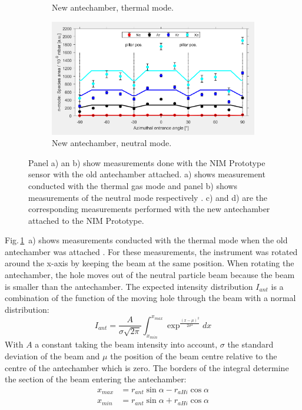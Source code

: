 \begin{figure}[h!]
\begin{subfigure}[b]{.5\textwidth}
			\caption{New antechamber, thermal mode.}
		\end{subfigure}
		\begin{subfigure}[b]{.5\textwidth}
			\centering
			\includegraphics[width=\textwidth]{Experiments/newAnte_NMode.png}
			\caption{New antechamber, neutral mode.}
		\end{subfigure}
		\caption{Panel a) an b) show measurements done with the NIM Prototype sensor with the old antechamber attached. a) shows measurement conducted with the thermal gas mode and panel b) shows measurements of the neutral mode respectively \cite{Meyer_2017_ante}. c) and d) are the corresponding measurements performed with the new antechamber attached to the NIM Prototype.}
		\label{fig:AnteMeasData}
	\end{figure}
	Fig.\,\ref{fig:AnteMeasData}~a) shows measurements conducted with the thermal mode when the old antechamber was attached \cite{Meyer_2017_ante}. For these measurements, the instrument was rotated around the x-axis by keeping the beam at the same position. When rotating the antechamber, the hole moves out of the neutral particle beam because the beam is smaller than the antechamber. The expected intensity distribution $I_{ant}$ is a combination of the function of the moving hole through the beam with a normal distribution:
	\begin{equation}
		I_{ant} = \frac{A}{\sigma\sqrt{2\pi}}\int_{x_{min}}^{x_{max}} \exp^{\frac{(x-\mu)^2}{2\sigma^2}} dx
	\end{equation}
	With $A$ a constant taking the beam intensity into account, $\sigma$ the standard deviation of the beam and $\mu$ the position of the beam centre relative to the centre of the antechamber which is zero. The borders of the integral determine the section of the beam entering the antechamber:
	\begin{align}
		x_{max} &= r_{ant}\sin{\alpha} - r_{aHi}\cos{\alpha}\label{eq:antIntgrLimHigh}\\
		x_{min} &= r_{ant}\sin{\alpha} + r_{aHi}\cos{\alpha}\label{eq:antIntgrLimLow}
	\end{align}
